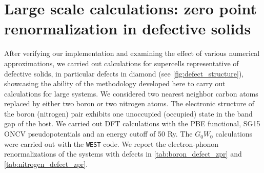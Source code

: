 \documentclass[journal=jctcce,manuscript=article]{achemso}
\begin{document}
\section{Large scale calculations: zero point renormalization in defective solids} 
After verifying our implementation and examining the effect of various numerical approximations, we carried out calculations for supercells representative of defective solids, in particular defects in diamond (see \autoref{fig:defect_structure}), showcasing the ability of the methodology developed here to carry out calculations for large systems. We considered two nearest neighbor carbon atoms replaced by either two boron or two nitrogen atoms. The electronic structure of the boron (nitrogen) pair exhibits one unoccupied (occupied) state in the band gap of the host. We carried out DFT calculations with the PBE functional\cite{perdew1996PBE}, SG15\cite{schlipf2015SG15} ONCV\cite{hamann2013ONCV} pseudopotentials and an energy cutoff of 50 Ry. The $G_0W_0$ calculations were carried out with the \texttt{WEST} code. We report the electron-phonon renormalizations of the systems with defects in \autoref{tab:boron_defect_zpr} and \autoref{tab:nitrogen_defect_zpr}.
\end{document}

